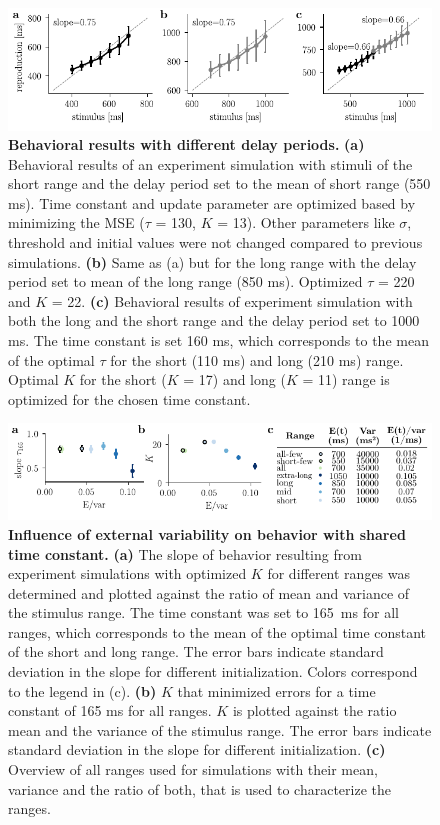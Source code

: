 \documentclass[10pt]{article}
\begin{document}
\begin{figure}[!htb]
	\centering
	\includegraphics{figures/supp_delay.pdf}
	\caption{\textbf{Behavioral results with different delay periods.}
	\textbf{(a)} Behavioral results of an experiment simulation with stimuli of the short range and the delay period set to the mean of short range (550 ms). Time constant and update parameter are optimized based by minimizing the MSE ($\tau$ = 130, $K$ = 13). Other parameters like $\sigma$, threshold and initial values were not changed compared to previous simulations.
	\textbf{(b)} Same as (a) but for the long range with the delay period set to mean of the long range (850 ms). Optimized $\tau$ = 220 and $K$ = 22.
	\textbf{(c)} Behavioral results of experiment simulation with both the long and the short range and the delay period set to 1000 ms. The time constant is set 160 ms, which corresponds to the mean of the optimal $\tau$ for the short (110 ms) and long (210 ms) range. Optimal $K$ for the short ($K$ = 17) and long ($K$ = 11) range is optimized for the chosen time constant. 
	}
\label{sup:delay}
\end{figure}

\begin{figure}[!htb]
	\centering
	\includegraphics{figures/supp_ranges_new.pdf}
	\caption{\textbf{Influence of external variability on behavior with shared time constant.}
	\textbf{(a)} The slope of behavior resulting from experiment simulations with optimized $K$ for different ranges was determined and plotted against the ratio of mean and variance of the stimulus range. The time constant was set to 165~ms for all ranges, which corresponds to the mean of the optimal time constant of the short and long range. The error bars indicate standard deviation in the slope for different initialization. Colors correspond to the legend in (c). 
	\textbf{(b)} $K$ that minimized errors for a time constant of 165 ms for all ranges. 
	$K$ is plotted against the ratio mean and the variance of the stimulus range.
	The error bars indicate standard deviation in the slope for different initialization. 
	\textbf{(c)} Overview of all ranges used for simulations with their mean, variance and the ratio of both, that is used to characterize the ranges.
	}
\label{sup:ranges}
\end{figure}
\end{document}
